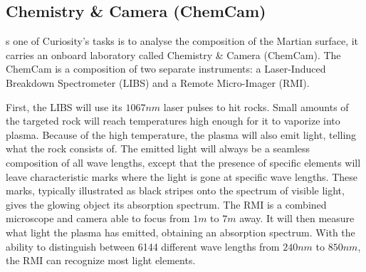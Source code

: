 \subsection{Chemistry \& Camera (ChemCam)}
s one of Curiosity's tasks is to analyse the composition of the Martian surface, it carries an onboard laboratory called Chemistry \& Camera (ChemCam).
The ChemCam is a composition of two separate instruments: a Laser-Induced Breakdown Spectrometer (LIBS) and a Remote Micro-Imager (RMI).

First, the LIBS will use its $1067 nm$ laser pulses to hit rocks.
Small amounts of the targeted rock will reach temperatures high enough for it to vaporize into plasma.
Because of the high temperature, the plasma will also emit light, telling what the rock consists of.
The emitted light will always be a seamless composition of all wave lengths, except that the presence of specific elements will leave characteristic marks where the light is gone at specific wave lengths.
These marks, typically illustrated as black stripes onto the spectrum of visible light, gives the glowing object its absorption spectrum.
The RMI is a combined microscope and camera able to focus from $1 m$ to $7 m$ away.
It will then measure what light the plasma has emitted, obtaining an absorption spectrum.
With the ability to distinguish between 6144 different wave lengths from $240 nm$ to $850 nm$, the RMI can recognize most light elements. \cite{ChemCam}